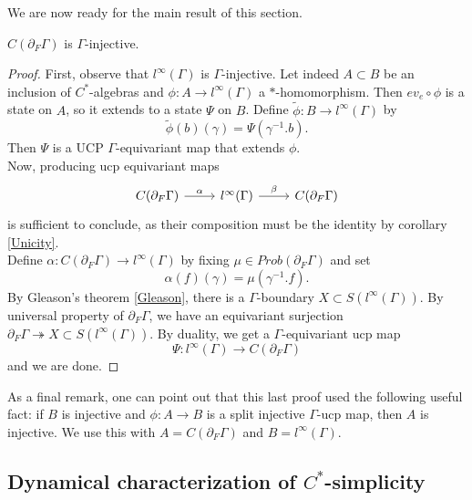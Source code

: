 We are now ready for the main result of this section.\\

\begin{thm}
$C(\partial_F \Gamma)$ is $\Gamma$-injective.
\end{thm}

\begin{proof}
First, observe that $l^\infty(\Gamma)$ is $\Gamma$-injective. Let indeed $A\subset B$ be an inclusion of $C^*$-algebras and $\phi: A \rightarrow l^\infty (\Gamma)$ a $*$-homomorphism. Then $ev_{e}\circ \phi$ is a state on $A$, so it extends to a state $\Psi$ on $B$. Define $\tilde \phi: B \rightarrow l^\infty (\Gamma)$ by 
\[\tilde \phi (b)(\gamma) = \Psi (\gamma^{-1}. b).\]
Then $\Psi$ is a UCP $\Gamma$-equivariant map that extends $\phi$.\\

Now, producing ucp equivariant maps
\[\begin{tikzcd} C(\partial_F \Gamma) \arrow{r}{\alpha} & l^\infty(\Gamma) \arrow{r}{\beta} & C(\partial_F \Gamma) \end{tikzcd} \] 
is sufficient to conclude, as their composition must be the identity by corollary \ref{Unicity}.\\

Define $\alpha : C(\partial_F \Gamma) \rightarrow l^\infty (\Gamma) $ by fixing $\mu\in Prob(\partial_F \Gamma)$ and set 
\[\alpha(f)(\gamma) = \mu (\gamma^{-1}.f).\]
By Gleason's theorem \ref{Gleason}, there is a $\Gamma$-boundary $X\subset S(l^\infty (\Gamma)) $. By universal property of $\partial_F \Gamma$, we have an equivariant surjection $\partial_F \Gamma \twoheadrightarrow X \subset S(l^\infty (\Gamma))$. By duality, we get a $\Gamma$-equivariant ucp map
\[\Psi : l^\infty (\Gamma) \rightarrow C(\partial_F \Gamma)\]
and we are done.
\end{proof}

As a final remark, one can point out that this last proof used the following useful fact: if $B$ is injective and $\phi: A \rightarrow B$ is a split injective $\Gamma$-ucp map, then $A$ is injective. We use this with $A=C(\partial_F \Gamma)$ and $B=l^\infty(\Gamma)$.  
\subsection{Dynamical characterization of $C^*$-simplicity}

